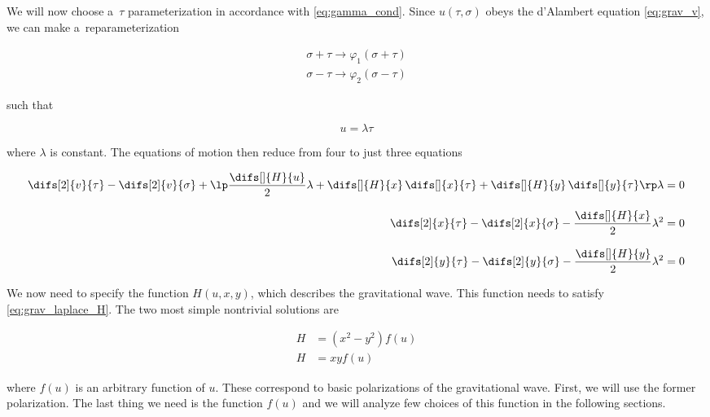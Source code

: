 \noindent
We will now choose a~$\tau$ parameterization in accordance with \cref{eq:gamma_cond}. Since $u(\tau, \sigma)$ obeys the d'Alambert equation \cref{eq:grav_v}, we can make a~reparameterization \cite{costa, schwarz}

\begin{equation}
\begin{aligned}
    \sigma + \tau \rightarrow \varphi_1(\sigma + \tau) \\
    \sigma - \tau \rightarrow \varphi_2(\sigma - \tau)
\end{aligned}
\end{equation}

\noindent
such that 

\begin{equation}
\label{eq:grav_u}
    u = \lambda \tau
\end{equation}

\noindent
where $\lambda$ is constant. The equations of motion then reduce from four to just three equations

\begin{align}
    \difs[2]{v}{\tau} - \difs[2]{v}{\sigma} + \lp \frac{\difs[]{H}{u}}{2} \lambda + 
    \difs[]{H}{x} \, \difs[]{x}{\tau} + \difs[]{H}{y} \, \difs[]{y}{\tau} \rp \lambda & = 0\\[3mm]
    \difs[2]{x}{\tau} - \difs[2]{x}{\sigma} - \frac{\difs[]{H}{x}}{2} \lambda^2 & = 0 \\[3mm]
    \difs[2]{y}{\tau} - \difs[2]{y}{\sigma} - \frac{\difs[]{H}{y}}{2} \lambda^2 & = 0
\end{align}

\noindent
We now need to specify the function $H(u, x, y)$, which describes the gravitational wave. This function needs to satisfy \cref{eq:grav_laplace_H}. The two most simple nontrivial solutions are 

\begin{align}
    \label{eq:grav_H_polarisation_1}    H &= (x^2 - y^2) f(u) \\
    \label{eq:grav_H_polarisation_2}    H &= xy f(u)
\end{align}

\noindent
where $f(u)$ is an arbitrary function of $u$. These correspond to basic polarizations of the gravitational wave. First, we will use the former polarization. 
The last thing we need is the function $f(u)$ and we will analyze few choices of this function in the following sections.


